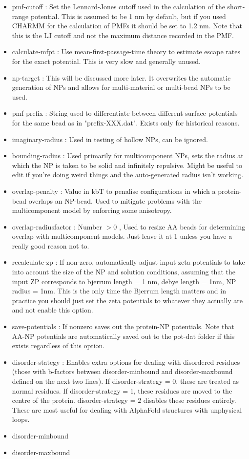 \documentclass[10pt,a4paper,onecolumn]{report}
\begin{document}
\begin{itemize}
\item pmf-cutoff : Set the Lennard-Jones cutoff used in the calculation of the short-range potential. This is assumed to be 1 nm by default, but if you used CHARMM for the calculation of PMFs it should be set to 1.2 nm. Note that this is the LJ cutoff and not the maximum distance recorded in the PMF. 
\item calculate-mfpt : Use mean-first-passage-time theory to estimate escape rates for the exact potential. This is very slow and generally unused.
\item np-target : This will be discussed more later. It overwrites the automatic generation of NPs and allows for multi-material or multi-bead NPs to be used. 
\item pmf-prefix : String used to differentiate between different surface potentials for the same bead as in "prefix-XXX.dat". Exists only for historical reasons. 
\item imaginary-radius : Used in testing of hollow NPs, can be ignored.
\item bounding-radius : Used primarily for multicomponent NPs, sets the radius at which the NP is taken to be solid and infinitely repulsive. Might be useful to edit if you're doing weird things and the auto-generated radius isn't working.
\item overlap-penalty : Value in kbT to penalise configurations in which a protein-bead overlaps an NP-bead. Used to mitigate problems with the multicomponent model by enforcing some anisotropy.
\item overlap-radiusfactor : Number $> 0$ , Used to resize AA beads for determining overlap with multicomponent models. Just leave it at 1 unless you have a really good reason not to. 
\item recalculate-zp : If non-zero, automatically adjust input zeta potentials to take into account the size of the NP and solution conditions, assuming that the input ZP corresponds to bjerrum length = 1 nm, debye length = 1nm, NP radius = 1nm. This is the only time the Bjerrum length matters and in practice you should just set the zeta potentials to whatever they actually are and not enable this option. 
\item save-potentials : If nonzero saves out the protein-NP potentials. Note that AA-NP potentials are automatically saved out to the pot-dat folder if this exists regardless of this option.
\item disorder-stategy : Enables extra options for dealing with disordered residues (those with b-factors between disorder-minbound and disorder-maxbound defined on the next two lines). If disorder-strategy = 0, these are treated as normal residues. If disorder-strategy = 1, these residues are moved to the centre of the protein.  disorder-strategy = 2 disables these residues entirely. These are most useful for dealing with AlphaFold structures with unphysical loops. 
\item disorder-minbound
\item disorder-maxbound
\end{itemize}
\end{document}
